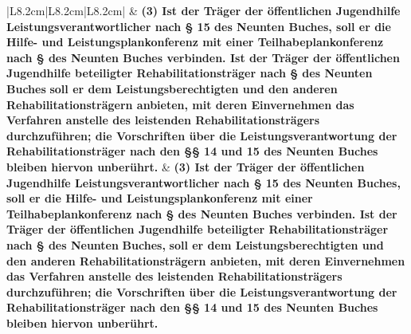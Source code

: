 \documentclass[10pt,a4paper,landscape]{article}
\begin{document}
\begin{longtable}{|L{8.2cm}|L{8.2cm}|L{8.2cm}|}
 & \textbf{(3) Ist der Träger der öffentlichen  \newline Jugendhilfe Leistungsverantwortlicher  \newline nach \S{} 15 des Neunten Buches, soll er  \newline die Hilfe- und Leistungsplankonferenz  \newline mit einer Teilhabeplankonferenz nach \S{}   des Neunten Buches verbinden. Ist  \newline der Träger der öffentlichen Jugendhilfe  \newline beteiligter Rehabilitationsträger nach \S{}   des Neunten }\textbf{\textcolor{diffred}{Buches}}\textbf{ soll er dem  \newline Leistungsberechtigten und den anderen  \newline Rehabilitationsträgern anbieten, mit  \newline deren Einvernehmen das Verfahren  \newline anstelle des leistenden  \newline Rehabilitationsträgers durchzuführen;  \newline die Vorschriften über die  \newline Leistungsverantwortung der  \newline Rehabilitationsträger nach den \S{}\S{} 14  \newline und 15 des Neunten Buches bleiben  \newline hiervon unberührt. } & \textbf{(3) Ist der Träger der öffentlichen  \newline Jugendhilfe Leistungsverantwortlicher  \newline nach \S{} 15 des Neunten Buches, soll er  \newline die Hilfe- und Leistungsplankonferenz  \newline mit einer Teilhabeplankonferenz nach \S{}   des Neunten Buches verbinden. Ist  \newline der Träger der öffentlichen Jugendhilfe  \newline beteiligter Rehabilitationsträger nach \S{}   des Neunten }\textbf{\textcolor{diffgreen}{Buches,}}\textbf{ soll er dem  \newline Leistungsberechtigten und den anderen  \newline Rehabilitationsträgern anbieten, mit  \newline deren Einvernehmen das Verfahren  \newline anstelle des leistenden  \newline Rehabilitationsträgers durchzuführen;  \newline die Vorschriften über die  \newline Leistungsverantwortung der  \newline Rehabilitationsträger nach den \S{}\S{} 14  \newline und 15 des Neunten Buches bleiben  \newline hiervon unberührt. } \\

\end{longtable}
\end{document}
